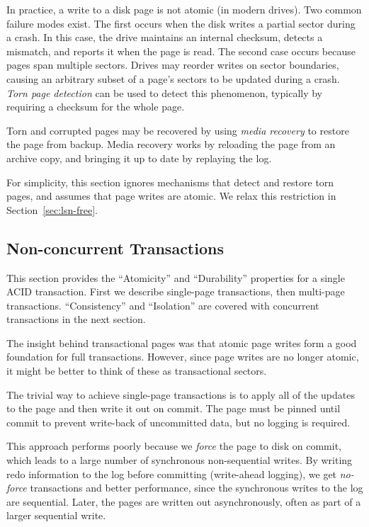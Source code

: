 \documentclass[letterpaper,twocolumn,10pt]{article}
\begin{document}
In practice, a write to a disk page is not atomic (in modern drives).  Two common failure
modes exist.  The first occurs when the disk writes a partial sector
during a crash.  In this case, the drive maintains an internal
checksum, detects a mismatch, and reports it when the page is read.
The second case occurs because pages span multiple sectors.  Drives
may reorder writes on sector boundaries, causing an arbitrary subset
of a page's sectors to be updated during a crash.  {\em Torn page
detection} can be used to detect this phenomenon, typically by
requiring a checksum for the whole page. 

Torn and corrupted pages may be recovered by using {\em media
recovery} to restore the page from backup.  Media recovery works by
reloading the page from an archive copy, and bringing it up to date by
replaying the log.

For simplicity, this section ignores mechanisms that detect
and restore torn pages, and assumes that page writes are atomic.
We relax this restriction in Section~\ref{sec:lsn-free}.

\subsection{Non-concurrent Transactions}

This section provides the ``Atomicity'' and ``Durability'' properties
for a single ACID transaction.
First we describe single-page transactions, then multi-page transactions.
``Consistency'' and ``Isolation'' are covered with 
concurrent transactions in the next section.

The insight behind transactional pages was
that atomic page writes form a good foundation for full transactions.
However, since page writes are no longer atomic, it might be
better to think of these as transactional sectors.

The trivial way to achieve single-page transactions is to apply all of
the updates to the page and then write it out on commit.  The page
must be pinned until commit to prevent write-back of uncommitted data,
but no logging is required.

This approach performs poorly because we {\em force} the page to disk
on commit, which leads to a large number of synchronous non-sequential
writes.  By writing redo information to the log before committing
(write-ahead logging), we get {\em no-force} transactions and better
performance, since the synchronous writes to the log are sequential.
Later, the pages are written out asynchronously, often
as part of a larger sequential write.
\end{document}
